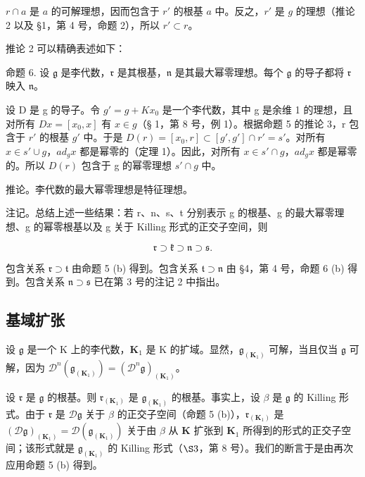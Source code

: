 \(r \cap a\) 是 \(a\) 的可解理想，因而包含于 \(r'\) 的根基 \(a\) 中。反之，\(r'\) 是 \(g\) 的理想（推论 2 以及 §1，第 4 号，命题 2），所以 \(r' \subset r\)。

推论 2 可以精确表述如下：

命题 6. 设 \(\mathfrak{g}\) 是李代数，\(\mathfrak{r}\) 是其根基，\(\mathfrak{n}\) 是其最大幂零理想。每个 \(\mathfrak{g}\) 的导子都将 \(\mathfrak{r}\) 映入 \(\mathfrak{n}\)。

设 D 是 g 的导子。令 \(g' = g + Kx_0\) 是一个李代数，其中 g 是余维 1 的理想，且对所有 \(Dx = [x_0, x]\) 有 \(x \in g\)（§ 1，第 8 号，例 1）。根据命题 5 的推论 3，r 包含于 \(r'\) 的根基 \(g'\) 中。于是 \(D(r) = [x_0, r] \subset [g', g'] \cap r' = s'\)。对所有 \(x \in s' \cup g\)，\(ad_g x\) 都是幂零的（定理 1）。因此，对所有 \(x \in s' \cap g\)，\(ad_g x\) 都是幂零的。所以 \(D(r)\) 包含于 g 的幂零理想 \(s' \cap g\) 中。

推论。李代数的最大幂零理想是特征理想。

注记。总结上述一些结果：若 r、n、s、t 分别表示 g 的根基、g 的最大幂零理想、g 的幂零根基以及 g 关于 Killing 形式的正交子空间，则

\[
\mathfrak {r} \supset \mathfrak {k} \supset \mathfrak {n} \supset \mathfrak {s}.
\]

包含关系 \(\mathfrak{r} \supset \mathfrak{t}\) 由命题 5 (b) 得到。包含关系 \(\mathfrak{t} \supset \mathfrak{n}\) 由 §4，第 4 号，命题 6 (b) 得到。包含关系 \(\mathfrak{n} \supset \mathfrak{s}\) 已在第 3 号的注记 2 中指出。

\subsection{基域扩张}

设 \(\mathfrak{g}\) 是一个 K 上的李代数，\(\mathbf{K}_1\) 是 K 的扩域。显然，\(\mathfrak{g}_{(\mathbf{K}_1)}\) 可解，当且仅当 \(\mathfrak{g}\) 可解，因为 \(\mathcal{D}^n (\mathfrak{g}_{(\mathbf{K}_1)}) = (\mathcal{D}^n\mathfrak{g})_{(\mathbf{K}_1)}\)。

设 \(\mathfrak{r}\) 是 \(\mathfrak{g}\) 的根基。则 \(\mathfrak{r}_{(\mathbf{K}_1)}\) 是 \(\mathfrak{g}_{(\mathbf{K}_1)}\) 的根基。事实上，设 \(\beta\) 是 \(\mathfrak{g}\) 的 Killing 形式。由于 \(\mathfrak{r}\) 是 \(\mathcal{D}\mathfrak{g}\) 关于 \(\beta\) 的正交子空间（命题 5 (b)），\(\mathfrak{r}_{(\mathbf{K}_1)}\) 是 \((\mathcal{D}\mathfrak{g})_{(\mathbf{K}_1)} = \mathcal{D}(\mathfrak{g}_{(\mathbf{K}_1)})\) 关于由 \(\beta\) 从 \(\mathbf{K}\) 扩张到 \(\mathbf{K}_1\) 所得到的形式的正交子空间；该形式就是 \(\mathfrak{g}_{(\mathbf{K}_1)}\) 的 Killing 形式（\(\S 3\)，第 8 号）。我们的断言于是由再次应用命题 5 (b) 得到。

